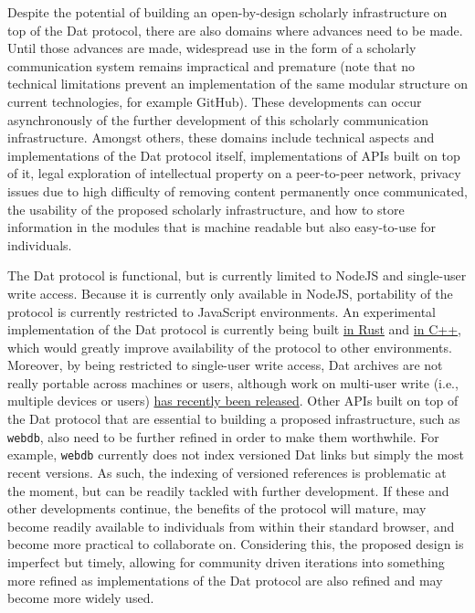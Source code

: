 \documentclass[publications,article,submit,moreauthors,pdftex,10pt,a4paper]{Definitions/mdpi}
\begin{document}
Despite the potential of building an open-by-design scholarly
infrastructure on top of the Dat protocol, there are also domains
where advances need to be made. Until those advances are made,
widespread use in the form of a scholarly communication system remains
impractical and premature (note that no technical limitations prevent
an implementation of the same modular structure on current
technologies, for example GitHub). These developments can occur
asynchronously of the further development of this scholarly
communication infrastructure. Amongst others, these domains include
technical aspects and implementations of the Dat protocol itself,
implementations of APIs built on top of it, legal exploration of
intellectual property on a peer-to-peer network, privacy issues due to
high difficulty of removing content permanently once communicated, the
usability of the proposed scholarly infrastructure, and how to store
information in the modules that is machine readable but also
easy-to-use for individuals.

The Dat protocol is functional, but is currently limited to NodeJS and
single-user write access. Because it is currently only available in
NodeJS, portability of the protocol is currently restricted to
JavaScript environments. An experimental implementation of the Dat
protocol is currently being built \href{https://github.com/datrs}{in
  Rust} and \href{https://github.com/datcxx}{in C++}, which would
greatly improve availability of the protocol to other
environments. Moreover, by being restricted to single-user write
access, Dat archives are not really portable across machines or users,
although work on multi-user write (i.e., multiple devices or users)
\href{https://github.com/mafintosh/hyperdb}{has recently been
  released}.  Other APIs built on top of the Dat protocol that are
essential to building a proposed infrastructure, such as
\texttt{webdb}, also need to be further refined in order to make them
worthwhile. For example, \texttt{webdb} currently does not index
versioned Dat links but simply the most recent versions. As such, the
indexing of versioned references is problematic at the moment, but can
be readily tackled with further development. If these and other
developments continue, the benefits of the protocol will mature, may
become readily available to individuals from within their standard
browser, and become more practical to collaborate on. Considering
this, the proposed design is imperfect but timely, allowing for
community driven iterations into something more refined as
implementations of the Dat protocol are also refined and may become
more widely used.
\end{document}
